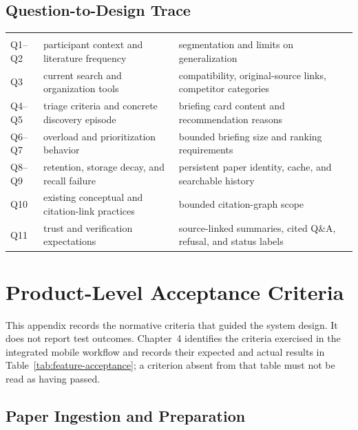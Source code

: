 \section{Question-to-Design Trace}

\begin{longtable}{P{1.2cm}P{4.9cm}P{6.7cm}}
\toprule
{} &  &  \\
\midrule
\endfirsthead
\toprule
{} &  &  \\
\midrule
\endhead
Q1--Q2 & participant context and literature frequency & segmentation and limits on generalization \\
Q3 & current search and organization tools & compatibility, original-source links, competitor categories \\
Q4--Q5 & triage criteria and concrete discovery episode & briefing card content and recommendation reasons \\
Q6--Q7 & overload and prioritization behavior & bounded briefing size and ranking requirements \\
Q8--Q9 & retention, storage decay, and recall failure & persistent paper identity, cache, and searchable history \\
Q10 & existing conceptual and citation-link practices & bounded citation-graph scope \\
Q11 & trust and verification expectations & source-linked summaries, cited Q\&A, refusal, and status labels \\
\bottomrule
\end{longtable}

\chapter{Product-Level Acceptance Criteria}
\label{app:acceptance}

This appendix records the normative criteria that guided the system design. It does not report test outcomes. Chapter~4 identifies the criteria exercised in the integrated mobile workflow and records their expected and actual results in Table~\ref{tab:feature-acceptance}; a criterion absent from that table must not be read as having passed.

\section{Paper Ingestion and Preparation}

